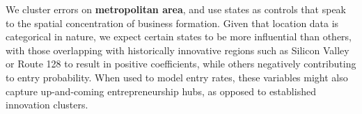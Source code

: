 We cluster errors on \textbf{metropolitan area}, and use states as controls that speak to the spatial concentration of business formation. Given that location data is categorical in nature, we expect certain states to be more influential than others, with those overlapping with historically innovative regions such as Silicon Valley or Route 128 to result in positive coefficients, while others negatively contributing to entry probability. When used to model entry rates, these variables might also capture up-and-coming entrepreneurship hubs, as opposed to established innovation clusters. 
































